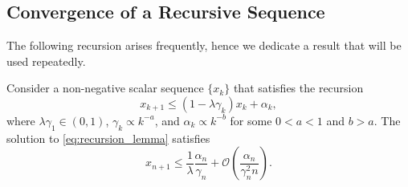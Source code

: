\documentclass[11pt]{article}
\begin{document}
\subsection{Convergence of a Recursive Sequence}\label{app:recursion_convergence}
The following recursion arises frequently, hence we dedicate a result that will be used repeatedly. 
\begin{lemma}\label{lem:recursion}
    Consider a non-negative scalar sequence $\{x_k\}$ that satisfies the recursion
    \begin{equation}\label{eq:recursion_lemma}
        x_{k+1} \leq (1 - \lambda \gamma_k) x_k + \alpha_k , 
    \end{equation}
    where $\lambda \gamma_1 \in (0, 1)$, $\gamma_k \propto k^{-a}$, and $\alpha_k \propto k^{-b}$ for some $0 < a  < 1$ and $b > a$. 
    The solution to \eqref{eq:recursion_lemma} satisfies
    \begin{equation}
        x_{n+1} \leq \frac{1}{\lambda} \frac{\alpha_n}{\gamma_n} 
        + \mathcal{O}\left(\frac{\alpha_n}{\gamma_n^2 n} \right)
        .
    \end{equation} 
\end{lemma}
\end{document}
